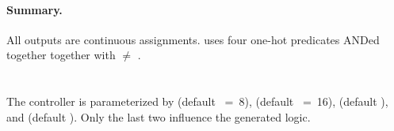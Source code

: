 \paragraph{Summary.}
All outputs are continuous assignments.  uses four
one-hot predicates ANDed together together with 
\(\neq\) .

\section{}
\label{app:ports-controller}

The controller is parameterized by  (default
~=~8), 
(default ~=~16), 
(default ), and  (default
).
Only the last two influence the generated logic.

